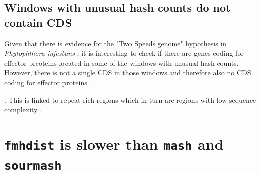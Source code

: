 \subsection*{Windows with unusual hash counts do not contain CDS}
Given that there is evidence for the "Two Speeds genome" hypothesis in
\textit{Phytophthora infestans} \cite{dongTwospeedGenomesFilamentous2015}, it is
interesting to check if there are genes coding for effector preoteins located in
some of the windows with unusual hash counts. However, there is not a single CDS
in those windows and therefore also no CDS coding for effector proteins.

. This
is linked to repeat-rich regions which in turn are regions with low sequence
complexity
\cite{tarailo-graovacUsingRepeatMaskerIdentify2009,pirogovHighcomplexityRegionsMammalian2019}. 

\section{\texttt{fmhdist} is slower than \texttt{mash} and \texttt{sourmash}}

\clearpage
